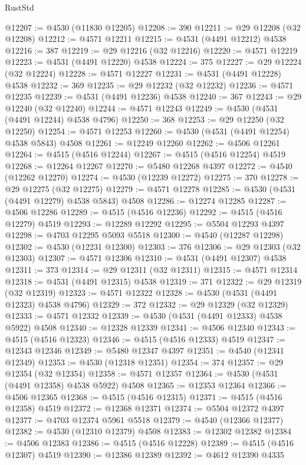 \begin{lexlean}{RustStd}
\begin{coremodule}
{\begin{coremodule}
{{{{{{{{{{{{{{{{{{{{{{{{{{{{{{{{{{{{{{{{{{{{{{{{{{{{{{{@12207 := @4530 (@11830 @12205)
@12208 := 390
@12211 := @29 @12208 (@32 @12208)
@12212 := @4571 @12211
@12215 := @4531 (@4491 @12212) @4538
@12216 := 387
@12219 := @29 @12216 (@32 @12216)
@12220 := @4571 @12219
@12223 := @4531 (@4491 @12220) @4538
@12224 := 375
@12227 := @29 @12224 (@32 @12224)
@12228 := @4571 @12227
@12231 := @4531 (@4491 @12228) @4538
@12232 := 369
@12235 := @29 @12232 (@32 @12232)
@12236 := @4571 @12235
@12239 := @4531 (@4491 @12236) @4538
@12240 := 367
@12243 := @29 @12240 (@32 @12240)
@12244 := @4571 @12243
@12249 := @4530 (@4531 (@4491 @12244) @4538 @4796)
@12250 := 368
@12253 := @29 @12250 (@32 @12250)
@12254 := @4571 @12253
@12260 := @4530 (@4531 (@4491 @12254) @4538 @5843) @4508
@12261 := @12249 @12260
@12262 := @4506 @12261
@12264 := @4515 (@4516 @12244)
@12267 := @4515 (@4516 @12254) @4519
@12268 := @12264 @12267
@12270 := @5480 @12268 @4397
@12272 := @4540 (@12262 @12270)
@12274 := @4530 (@12239 @12272)
@12275 := 370
@12278 := @29 @12275 (@32 @12275)
@12279 := @4571 @12278
@12285 := @4530 (@4531 (@4491 @12279) @4538 @5843) @4508
@12286 := @12274 @12285
@12287 := @4506 @12286
@12289 := @4515 (@4516 @12236)
@12292 := @4515 (@4516 @12279) @4519
@12293 := @12289 @12292
@12295 := @5504 @12293 @4397
@12298 := @4703 @12295 @5093 @5518
@12300 := @4540 (@12287 @12298)
@12302 := @4530 (@12231 @12300)
@12303 := 376
@12306 := @29 @12303 (@32 @12303)
@12307 := @4571 @12306
@12310 := @4531 (@4491 @12307) @4538
@12311 := 373
@12314 := @29 @12311 (@32 @12311)
@12315 := @4571 @12314
@12318 := @4531 (@4491 @12315) @4538
@12319 := 371
@12322 := @29 @12319 (@32 @12319)
@12323 := @4571 @12322
@12328 := @4530 (@4531 (@4491 @12323) @4538 @4796)
@12329 := 372
@12332 := @29 @12329 (@32 @12329)
@12333 := @4571 @12332
@12339 := @4530 (@4531 (@4491 @12333) @4538 @5922) @4508
@12340 := @12328 @12339
@12341 := @4506 @12340
@12343 := @4515 (@4516 @12323)
@12346 := @4515 (@4516 @12333) @4519
@12347 := @12343 @12346
@12349 := @5480 @12347 @4397
@12351 := @4540 (@12341 @12349)
@12353 := @4530 (@12318 @12351)
@12354 := 374
@12357 := @29 @12354 (@32 @12354)
@12358 := @4571 @12357
@12364 := @4530 (@4531 (@4491 @12358) @4538 @5922) @4508
@12365 := @12353 @12364
@12366 := @4506 @12365
@12368 := @4515 (@4516 @12315)
@12371 := @4515 (@4516 @12358) @4519
@12372 := @12368 @12371
@12374 := @5504 @12372 @4397
@12377 := @4703 @12374 @5961 @5518
@12379 := @4540 (@12366 @12377)
@12382 := @4530 (@12310 @12379) @4508
@12383 := @12302 @12382
@12384 := @4506 @12383
@12386 := @4515 (@4516 @12228)
@12389 := @4515 (@4516 @12307) @4519
@12390 := @12386 @12389
@12392 := @4612 @12390 @4335
}}}}}}}}}}}}}}}}}}}}}}}}}}}}}}}}}}}}}}}}}}}}}}}}}}}}}}}
\end{coremodule}}
\end{coremodule}
\end{lexlean}
